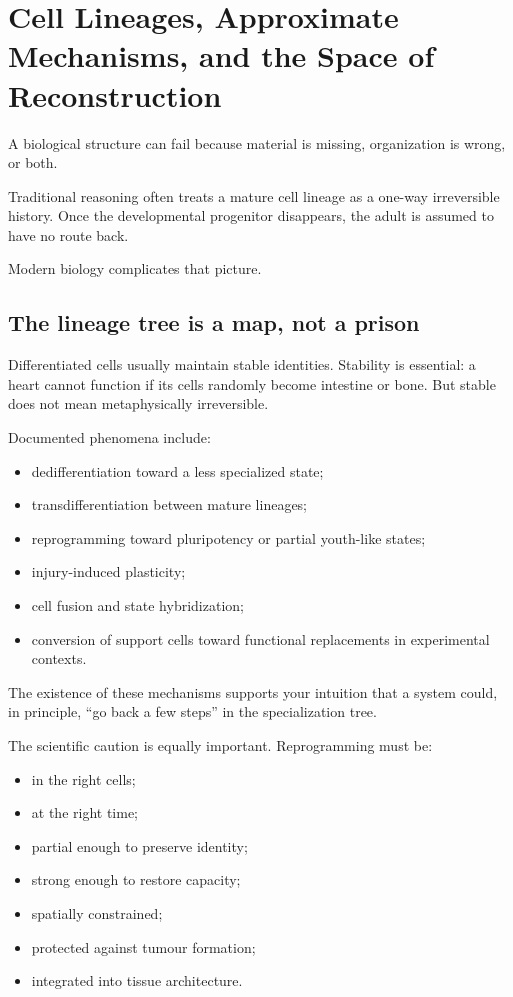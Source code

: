 \chapter{Cell Lineages, Approximate Mechanisms, and the Space of Reconstruction}

A biological structure can fail because material is missing, organization is wrong, or both.

Traditional reasoning often treats a mature cell lineage as a one-way irreversible history. Once the developmental progenitor disappears, the adult is assumed to have no route back.

Modern biology complicates that picture.

\section{The lineage tree is a map, not a prison}

Differentiated cells usually maintain stable identities. Stability is essential: a heart cannot function if its cells randomly become intestine or bone. But stable does not mean metaphysically irreversible.

Documented phenomena include:

\begin{itemize}
\tightlist
\item
  dedifferentiation toward a less specialized state;
\item
  transdifferentiation between mature lineages;
\item
  reprogramming toward pluripotency or partial youth-like states;
\item
  injury-induced plasticity;
\item
  cell fusion and state hybridization;
\item
  conversion of support cells toward functional replacements in experimental contexts.
\end{itemize}

The existence of these mechanisms supports your intuition that a system could, in principle, ``go back a few steps'' in the specialization tree.

The scientific caution is equally important. Reprogramming must be:

\begin{itemize}
\tightlist
\item
  in the right cells;
\item
  at the right time;
\item
  partial enough to preserve identity;
\item
  strong enough to restore capacity;
\item
  spatially constrained;
\item
  protected against tumour formation;
\item
  integrated into tissue architecture.
\end{itemize}


